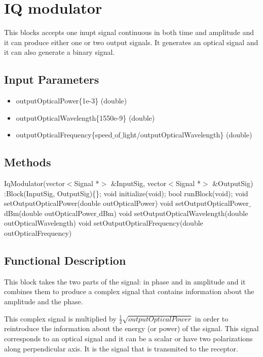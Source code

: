 \clearpage

\section{IQ modulator}

This blocks accepts one inupt signal continuous in both time and amplitude and it can produce either one or two output signals. It generates an optical signal and it can also generate a binary signal. 

\subsection*{Input Parameters}

\begin{itemize}
	\item outputOpticalPower\{1e-3\} \linebreak
	(double)
	\item outputOpticalWavelength\{1550e-9\} \linebreak (double)
	\item outputOpticalFrequency\{speed$\_$of$\_$light/outputOpticalWavelength\} \linebreak
	(double)
\end{itemize}

\subsection*{Methods}

IqModulator(vector$<$Signal *$>$ \&InputSig, vector$<$Signal *$>$ \&OutputSig) :Block(InputSig, OutputSig)\{\};
\bigbreak
void initialize(void);
\bigbreak
bool runBlock(void);
\bigbreak
void setOutputOpticalPower(double outOpticalPower) 
\bigbreak
void setOutputOpticalPower$\_$dBm(double outOpticalPower$\_$dBm) 
\bigbreak
void setOutputOpticalWavelength(double outOpticalWavelength) 
\bigbreak
void setOutputOpticalFrequency(double outOpticalFrequency) 

\subsection*{Functional Description}

This block takes the two parts of the signal: in phase and in amplitude and it combines them to produce a complex signal that contains information about the amplitude and the phase.

This complex signal is multiplied by $\frac{1}{2}\sqrt{\textit{outputOpticalPower}}$ in order to reintroduce the information about the energy (or power) of the signal. This signal corresponds to an optical signal and it can be a scalar or have two polarizations along perpendicular axis. It is the signal that is transmited to the receptor. 


